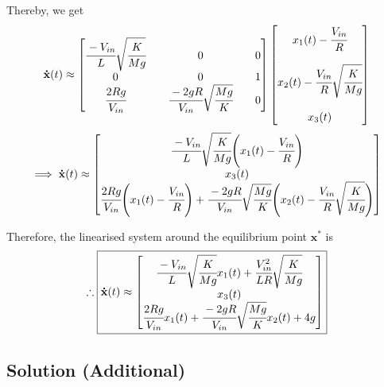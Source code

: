 Thereby, we get
\[
    \mathbf{\dot x}(t) \approx
    \begin{bmatrix}
        \cfrac{-V_{in}}{L} \sqrt{\cfrac{K}{Mg}} &  & 0                                        &  & 0 \\
        0                                       &  & 0                                        &  & 1 \\
        \cfrac{2 R g}{V_{in}}                   &  & \cfrac{-2gR}{V_{in}}\sqrt{\cfrac{Mg}{K}} &  & 0
    \end{bmatrix}
    \begin{bmatrix}
        x_1(t) - \cfrac{V_{in}}{R}                      \\
        \\
        x_2(t) - \cfrac{V_{in}}{R} \sqrt{\cfrac{K}{Mg}} \\
        \\
        x_3(t)
    \end{bmatrix}
\]
\[
    \implies
    \mathbf{\dot x}(t) \approx
    \begin{bmatrix}
        \cfrac{-V_{in}}{L} \sqrt{\cfrac{K}{Mg}} \Bigg( x_1(t) - \cfrac{V_{in}}{R} \Bigg) \\
        x_3(t)                                                                           \\
        \cfrac{2 R g}{V_{in}} \Bigg( x_1(t) - \cfrac{V_{in}}{R} \Bigg) + \cfrac{-2gR}{V_{in}}\sqrt{\cfrac{Mg}{K}} \Bigg( x_2(t) - \cfrac{V_{in}}{R} \sqrt{\cfrac{K}{Mg}} \Bigg)
    \end{bmatrix}
\]

Therefore, the linearised system around the equilibrium point \( \mathbf{x^*} \) is
\[
    \therefore
    \boxed{
        \mathbf{\dot x}(t) \approx
        \begin{bmatrix}
            \cfrac{-V_{in}}{L} \sqrt{\cfrac{K}{Mg}} x_1(t) + \cfrac{V_{in}^2}{LR} \sqrt{\cfrac{K}{Mg}} \\
            x_3(t)                                                                                     \\
            \cfrac{2 R g}{V_{in}} x_1(t) + \cfrac{-2gR}{V_{in}} \sqrt{\cfrac{Mg}{K}} x_2(t) + 4g
        \end{bmatrix}
    }
\]

\clearpage
\subsection*{Solution (Additional)}

